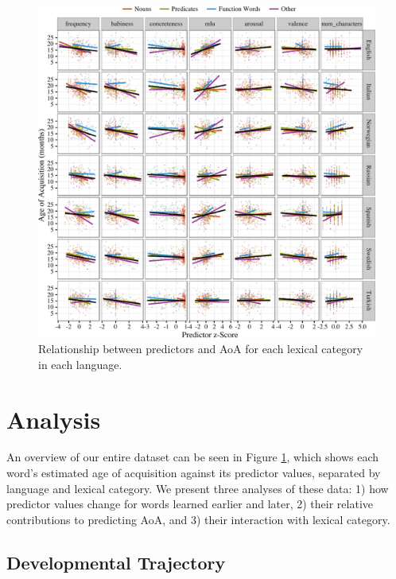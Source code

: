 \documentclass[10pt, letterpaper]{article}
\newenvironment{CodeChunk}{}{}
\begin{document}
\begin{CodeChunk}
\begin{figure}[!h]

{\centering \includegraphics{figs/data-1} 

}

\caption[Relationship between predictors and AoA for each lexical category in each language]{Relationship between predictors and AoA for each lexical category in each language.}\label{fig:data}
\end{figure}
\end{CodeChunk}

\section{Analysis}\label{analysis}

An overview of our entire dataset can be seen in Figure \ref{fig:data},
which shows each word's estimated age of acquisition against its
predictor values, separated by language and lexical category. We present
three analyses of these data: 1) how predictor values change for words
learned earlier and later, 2) their relative contributions to predicting
AoA, and 3) their interaction with lexical category.

\subsection{Developmental Trajectory}\label{developmental-trajectory}
\end{document}
